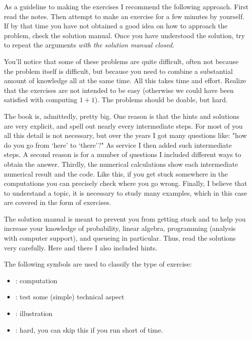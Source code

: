 As a guideline to making the exercises I recommend the following approach.
First read the notes.
Then attempt to make an exercise for a few minutes  by yourself.
If by that time you have not obtained a good idea on how to approach the problem, check the solution manual.
Once you have understood the solution, try to repeat the arguments \emph{with the solution manual closed}.

You'll notice that some of these problems are quite difficult, often not because the problem itself is difficult, but because you need to combine a substantial amount of knowledge all at the same time.
All this takes time and effort.
Realize that the exercises are not intended to be easy (otherwise we could have been satisfied with computing $1+1$).
The problems should be doable, but hard.

The book is, admittedly, pretty big.
One reason is that the hints and solutions are very explicit, and spell out nearly every intermediate steps.
For most of you all this detail is not necessary, but over the years I got many questions like: "how do you go from `here' to `there'?"
As service I then added such intermediate steps.
A second reason is for a number of questions I included different ways to obtain the answer.
Thirdly, the numerical calculations show each intermediate numerical result and the code.
Like this, if you get stuck somewhere in the computations you can precisely check where you go wrong.
Finally, I believe that to understand a topic, it is necessary to study many examples, which in this case are covered in the form of exercises.

The solution manual is meant to prevent you from getting stuck and to help you increase your knowledge of probability, linear algebra, programming (analysis with computer support), and queueing in particular.
Thus, read the solutions very carefully.
Here and there I also included hints.

The following symbols are used to classify the type of exercise:
\begin{itemize}
\item \faCalculator: computation
\item \faFlask:  test some (simple) technical aspect
\item \faPhoto: illustration
\item \faRocket: hard, you can skip this if you run short of time. 
\end{itemize}



